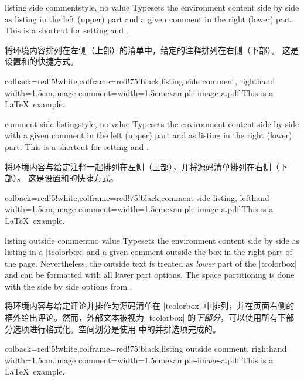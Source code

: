 \begin{docTcbKey}{listing side comment}{}{style, no value}
Typesets the environment content side by side as listing in the left (upper)
part and a given comment in the right (lower) part.
This is a shortcut for setting  and .

将环境内容排列在左侧（上部）的清单中，给定的注释排列在右侧（下部）。 这是设置和的快捷方式。
\begin{dispExample}
\begin{tcblisting}{colback=red!5!white,colframe=red!75!black,listing side comment,
righthand width=1.5cm,image comment={width=1.5cm}{example-image-a.pdf}}
This is a \LaTeX\ example.
\end{tcblisting}
\end{dispExample}
\end{docTcbKey}


\begin{docTcbKey}{comment side listing}{}{style, no value}
Typesets the environment content side by side with a given comment in the left (upper)
part and as listing in the right (lower) part.
This is a shortcut for setting  and .

将环境内容与给定注释一起排列在左侧（上部），并将源码清单排列在右侧（下部）。 这是设置和的快捷方式。
\begin{dispExample}
\begin{tcblisting}{colback=red!5!white,colframe=red!75!black,comment side listing,
lefthand width=1.5cm,image comment={width=1.5cm}{example-image-a.pdf}}
This is a \LaTeX\ example.
\end{tcblisting}
\end{dispExample}
\end{docTcbKey}


\begin{docTcbKey}{listing outside comment}{}{no value}
Typesets the environment content side by side as listing in a |tcolorbox|
and a given comment outside the box in the right part of the page.
Nevertheless, the outside text is treated as \emph{lower} part of the
|tcolorbox| and can be formatted with all lower part options.
The space partitioning is done with the side by side options from
.

将环境内容与给定评论并排作为源码清单在 |tcolorbox| 中排列，并在页面右侧的框外给出评论。然而，外部文本被视为 |tcolorbox| 的\emph{下部分}，可以使用所有下部分选项进行格式化。空间划分是使用  中的并排选项完成的。
\begin{dispExample}
\begin{tcblisting}{colback=red!5!white,colframe=red!75!black,listing outside comment,
righthand width=1.5cm,image comment={width=1.5cm}{example-image-a.pdf}}
This is a \LaTeX\ example.
\end{tcblisting}
\end{dispExample}
\end{docTcbKey}


